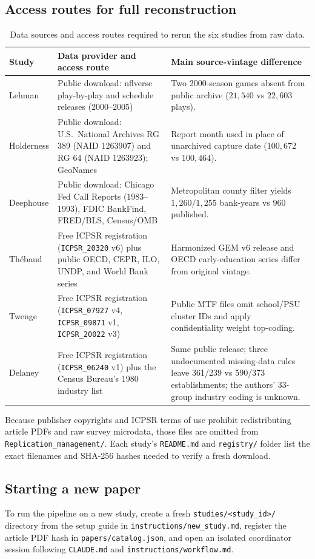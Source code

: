 \documentclass[11pt]{article}
\newcommand{\artifact}[1]{\nolinkurl{#1}}
\begin{document}
\subsection{Access routes for full reconstruction}
\begin{table}[H]\centering\small
\begin{tabularx}{\linewidth}{@{}lYY@{}}\toprule
Study & Data provider and access route & Main source-vintage difference\\\midrule
Lehman & Public download: nflverse play-by-play and schedule releases (2000--2005) & Two 2000-season games absent from public archive ($21,540$ vs $22,603$ plays).\\
Holderness & Public download: U.S.\ National Archives RG 389 (NAID 1263907) and RG 64 (NAID 1263923); GeoNames & Report month used in place of unarchived capture date ($100,672$ vs $100,464$).\\
Deephouse & Public download: Chicago Fed Call Reports (1983--1993), FDIC BankFind, FRED/BLS, Census/OMB & Metropolitan county filter yields $1,260 / 1,255$ bank-years vs $960$ published.\\
Th\'ebaud & Free ICPSR registration (\texttt{ICPSR\_20320} v6) plus public OECD, CEPR, ILO, UNDP, and World Bank series & Harmonized GEM v6 release and OECD early-education series differ from original vintage.\\
Twenge & Free ICPSR registration (\texttt{ICPSR\_07927} v4, \texttt{ICPSR\_09871} v1, \texttt{ICPSR\_20022} v3) & Public MTF files omit school/PSU cluster IDs and apply confidentiality weight top-coding.\\
Delaney & Free ICPSR registration (\texttt{ICPSR\_06240} v1) plus the Census Bureau's 1980 industry list & Same public release; three undocumented missing-data rules leave 361/239 vs 590/373 establishments; the authors' 33-group industry coding is unknown.\\\bottomrule
\end{tabularx}\caption{Data sources and access routes required to rerun the six studies from raw data.}\end{table}
Because publisher copyrights and ICPSR terms of use prohibit redistributing article PDFs and raw survey microdata, those files are omitted from \artifact{Replication_management/}. Each study's \artifact{README.md} and \artifact{registry/} folder list the exact filenames and SHA-256 hashes needed to verify a fresh download.

\subsection{Starting a new paper}
To run the pipeline on a new study, create a fresh \artifact{studies/<study_id>/} directory from the setup guide in \artifact{instructions/new_study.md}, register the article PDF hash in \artifact{papers/catalog.json}, and open an isolated coordinator session following \artifact{CLAUDE.md} and \artifact{instructions/workflow.md}.
\end{document}
